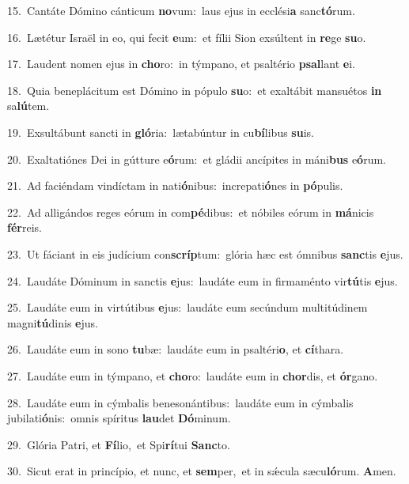 {\numbfont\textcolor{\numbcolor}{15.}}~Cantáte Dómino cánticum \textbf{no}\-vum:~\star laus ejus in ecclési\textbf{a} sanc\-\textbf{tó}\-rum.\par
{\numbfont\textcolor{\numbcolor}{16.}}~Lætétur Israël in eo, qui fecit \textbf{e}\-um:~\star et fílii Sion exsúltent in \textbf{re}\-ge \textbf{su}\-o.\par
{\numbfont\textcolor{\numbcolor}{17.}}~Laudent nomen ejus in \textbf{cho}\-ro:~\star in týmpano, et psaltério \textbf{psal}\-lant \textbf{e}\-i.\par
{\numbfont\textcolor{\numbcolor}{18.}}~Quia beneplácitum est Dómino in pópulo \textbf{su}\-o:~\star et exaltábit mansuétos \textbf{in} sa\-\textbf{lú}\-tem.\par
{\numbfont\textcolor{\numbcolor}{19.}}~Exsultábunt sancti in \textbf{gló}\-ria:~\star lætabúntur in cu\-\textbf{bí}\-libus \textbf{su}\-is.\par
{\numbfont\textcolor{\numbcolor}{20.}}~Exaltatiónes Dei in gútture e\-\textbf{ó}\-rum:~\star et gládii ancípites in máni\textbf{bus} e\-\textbf{ó}\-rum.\par
{\numbfont\textcolor{\numbcolor}{21.}}~Ad faciéndam vindíctam in nati\-\textbf{ó}\-nibus:~\star increpati\-\textbf{ó}\-nes in \textbf{pó}\-pulis.\par
{\numbfont\textcolor{\numbcolor}{22.}}~Ad alligándos reges eórum in com\-\textbf{pé}\-dibus:~\star et nóbiles eórum in \textbf{má}\-nicis \textbf{fér}\-reis.\par
{\numbfont\textcolor{\numbcolor}{23.}}~Ut fáciant in eis judícium con\-\textbf{scríp}\-tum:~\star glória hæc est ómnibus \textbf{sanc}\-tis \textbf{e}\-jus.\par
{\numbfont\textcolor{\numbcolor}{24.}}~Laudáte Dóminum in sanctis \textbf{e}\-jus:~\star laudáte eum in firmaménto vir\-\textbf{tú}\-tis \textbf{e}\-jus.\par
{\numbfont\textcolor{\numbcolor}{25.}}~Laudáte eum in virtútibus \textbf{e}\-jus:~\star laudáte eum secúndum multitúdinem magni\-\textbf{tú}\-dinis \textbf{e}\-jus.\par
{\numbfont\textcolor{\numbcolor}{26.}}~Laudáte eum in sono \textbf{tu}\-bæ:~\star laudáte eum in psaltéri\-\textbf{o}\-, et \textbf{cí}\-thara.\par
{\numbfont\textcolor{\numbcolor}{27.}}~Laudáte eum in týmpano, et \textbf{cho}\-ro:~\star laudáte eum in \textbf{chor}\-dis, et \textbf{ór}\-gano.\par
{\numbfont\textcolor{\numbcolor}{28.}}~Laudáte eum in cýmbalis benesonántibus:~\dagger laudáte eum in cýmbalis jubilati\-\textbf{ó}\-nis:~\star omnis spíritus \textbf{lau}\-det \textbf{Dó}\-minum.\par
{\numbfont\textcolor{\numbcolor}{29.}}~Glória Patri, et \textbf{Fí}\-lio,~\star et Spi\-\textbf{rí}\-tui \textbf{Sanc}\-to.\par
{\numbfont\textcolor{\numbcolor}{30.}}~Sicut erat in princípio, et nunc, et \textbf{sem}\-per,~\star et in sǽcula sæcu\-\textbf{ló}\-rum. \textbf{A}\-men.\par
